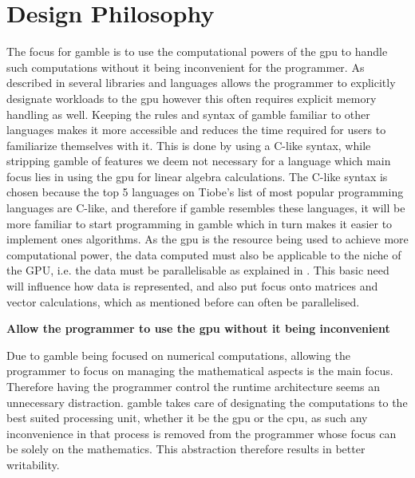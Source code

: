\section{Design Philosophy}\label{sec:phil}

The focus for \gls{gamble} is to use the computational powers of the \acrshort{gpu} to handle such computations without it being inconvenient for the programmer.
As described in  several libraries and languages allows the programmer to explicitly designate workloads to the \acrshort{gpu} however this often requires explicit memory handling as well.
Keeping the rules and syntax of \gls{gamble} familiar to other languages makes it more accessible and reduces the time required for users to familiarize themselves with it.
This is done by using a C-like syntax, while stripping \gls{gamble} of features we deem not necessary for a language which main focus lies in using the \acrshort{gpu} for  linear algebra calculations.
The C-like syntax is chosen because the top 5 languages on Tiobe's list of most popular programming languages are C-like, and therefore if \gls{gamble} resembles these languages, it will be more familiar to start programming in \gls{gamble} which in turn makes it easier to implement ones algorithms.\citep{TIOBE}
As the \acrshort{gpu} is the resource being used to achieve more computational power, the data computed must also be applicable to the niche of the GPU, i.e. the data must be parallelisable as explained in .
This basic need will influence how data is represented, and also put focus onto matrices and vector calculations, which as mentioned before can often be parallelised.

\textbf{Allow the programmer to use the \acrshort{gpu} without it being inconvenient}

Due to \gls{gamble} being focused on numerical computations, allowing the programmer to focus on managing the mathematical aspects is the main focus.
Therefore having the programmer control the runtime architecture seems an unnecessary distraction.
\gls{gamble} takes care of designating the computations to the best suited processing unit, whether it be the \acrshort{gpu} or the \acrshort{cpu}, as such any inconvenience in that process is removed from the programmer whose focus can be solely on the mathematics.
This abstraction therefore results in better writability.


